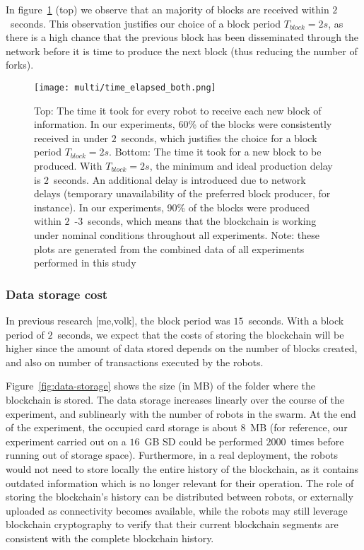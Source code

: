 \documentclass[runningheads]{llncs}
\begin{document}
 In figure~\ref{fig:block-histograms} (top) we observe that an majority of blocks are received within $2$~seconds. This observation justifies our choice of a block period $T_{block}=2s$, as there is a high chance that the previous block has been disseminated through the network before it is time to produce the next block (thus reducing the number of forks).

\begin{figure}
  \centering
  \texttt{[image: multi/time\_elapsed\_both.png]}
  \caption{Top: The time it took for every robot to receive each new block of information. In our experiments, 60\% of the blocks were consistently received in under $2$~seconds, which justifies the choice for a block period $T_{block}=2s$. Bottom: The time it took for a new block to be produced. With $T_{block}=2s$, the minimum and ideal production delay is $2$~seconds. An additional delay is introduced due to network delays (temporary unavailability of the preferred block producer, for instance). In our experiments, 90\% of the blocks were produced within $2$~-$3$~seconds, which means that the blockchain is working under nominal conditions throughout all experiments. Note: these plots are generated from the combined data of all experiments performed in this study}
  \label{fig:block-histograms}
\end{figure}

\subsubsection{Data storage cost}

In previous research [me,volk], the block period was $15$~seconds. With a block period of $2$~seconds, we expect that the costs of storing the blockchain will be higher since the amount of data stored depends on the number of blocks created, and also on number of transactions executed by the robots. 

Figure~\ref{fig:data-storage} shows the size (in MB) of the folder where the blockchain is stored. The data storage increases linearly over the course of the experiment, and sublinearly with the number of robots in the swarm. At the end of the experiment, the occupied card storage is about $8$~MB (for reference, our experiment carried out on a $16$~GB SD could be performed $2000$~times before running out of storage space). Furthermore, in a real deployment, the robots would not need to store locally the entire history of the blockchain, as it contains outdated information which is no longer relevant for their operation. The role of storing the blockchain's history can be distributed between robots, or externally uploaded as connectivity becomes available, while the robots may still leverage blockchain cryptography to verify that their current blockchain segments are consistent with the complete blockchain history.
\end{document}

